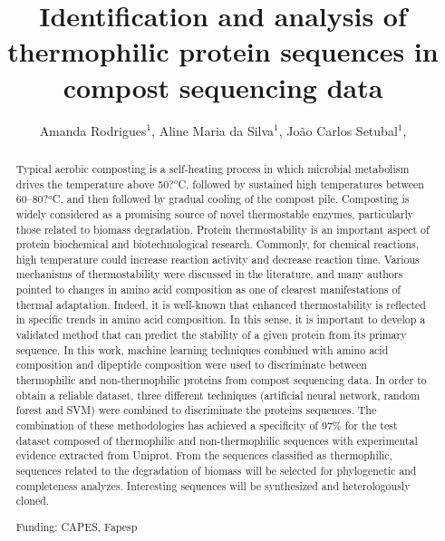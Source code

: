 \documentclass[twoside]{article}
\title{\vspace{-15mm}\fontsize{24pt}{10pt}\selectfont\textbf{ Identification and analysis of thermophilic protein sequences in compost sequencing data }} %
\author{ Amanda Rodrigues$^{1}$, Aline Maria da Silva$^{1}$, João Carlos Setubal$^{1}$, }
\affil{ 1 USP

 }
\date{}
\begin{document}
  
  
  \maketitle %
  
  
  \thispagestyle{fancy} %
  
  
  \begin{abstract}
  Typical aerobic composting is a self-heating process in which microbial metabolism drives the temperature above 50?$^o$C, followed by sustained high temperatures between 60–80?$^o$C, and then followed by gradual cooling of the compost pile. Composting is widely considered as a promising source of novel thermostable enzymes, particularly those related to biomass degradation. Protein thermostability is an important aspect of protein biochemical and biotechnological research. Commonly, for chemical reactions, high temperature could increase reaction activity and decrease reaction time. Various mechanisms of thermostability were discussed in the literature, and many authors pointed to changes in amino acid composition as one of clearest manifestations of thermal adaptation. Indeed, it is well-known that enhanced thermostability is reflected in specific trends in amino acid composition. In this sense, it is important to develop a validated method that can predict the stability of a given protein from its primary sequence. In this work, machine learning techniques combined with amino acid composition and dipeptide composition were used to discriminate between thermophilic and non-thermophilic proteins from compost sequencing data. In order to obtain a reliable dataset, three different techniques (artificial neural network, random forest and SVM) were combined to discriminate the proteins sequences. The combination of these methodologies has achieved a specificity of 97\% for the test dataset composed of thermophilic and non-thermophilic sequences with experimental evidence extracted from Uniprot. From the sequences classified as thermophilic, sequences related to the degradation of biomass will be selected for phylogenetic and completeness analyzes. Interesting sequences will be synthesized and heterologously cloned.
  
  Funding: CAPES, Fapesp \\ 
  \end{abstract}
  
\end{document}
